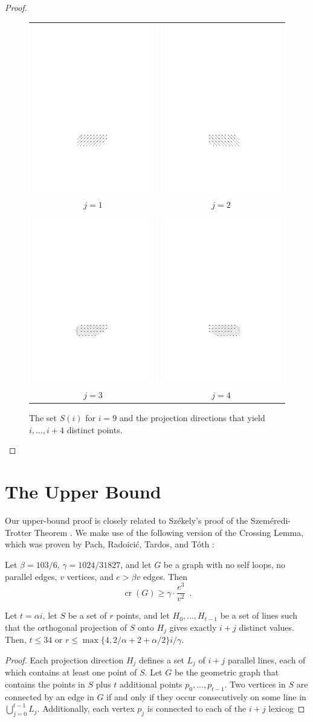 \documentclass{cccg10}
\DeclareMathOperator{\cn}{cr}
\begin{document}
\begin{proof}
\begin{figure}
\begin{center}
\begin{tabular}{cc}
       \includegraphics{j1} & \includegraphics{j2} \\
        $j=1$ & $j=2$ \\
       \includegraphics{j3} & \includegraphics{j4} \\
        $j=3$ & $j=4$
    \end{tabular}
  \end{center}
  \caption{The set $S(i)$  for $i=9$ and the projection directions that yield $i,\ldots,i+4$ distinct points.}
\end{figure}
\end{proof}



\section{The Upper Bound}

Our upper-bound proof is closely related to Sz\'ekely's proof of the
Szem\'eredi-Trotter Theorem \cite{s97}.  We make use of the following
version of the Crossing Lemma, which was proven by Pach, Radoici\'c,
Tardos, and T\'oth \cite{prtt04}:

\begin{lem}\label{lem:crossing}
Let
$\beta=103/6$, $\gamma = 1024/31827$, and let
$G$ be a graph with no self loops, no parallel edges, $v$ vertices, and
$e > \beta v$ edges.  Then
\[
  \cn(G) \ge \gamma \cdot \frac{e^3}{v^2} \enspace .
\]
\end{lem}


\begin{lem}
Let $t=\alpha i$, let $S$ be a set of $r$ points, and let
$H_0,\ldots,H_{t-1}$ be a set of lines such that the orthogonal projection
of $S$ onto $H_{j}$ gives exactly $i+j$ distinct values.  Then, $t\le 34$
or $r\le \max\{4,2/\alpha + 2 + \alpha/2\}i/\gamma$.
\end{lem}

\begin{proof}
Each projection direction $H_j$ defines a set $L_j$ of $i+j$ parallel
lines, each of which contains at least one point of $S$.  Let $G$ be
the geometric graph that contains the points in $S$ plus $t$ additional
points $p_0,\ldots,p_{t-1}$.  Two vertices in $S$ are connected by an
edge in $G$ if and only if they occur consecutively on some line in
$\bigcup_{j=0}^{t-1}L_j$.  Additionally, each vertex $p_j$ is connected
to each of the $i+j$ lexicog
\end{proof}
\end{document}

